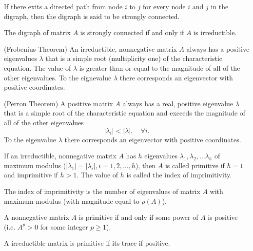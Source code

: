 \begin{definition}
If there exits a directed path from node $i$ to $j$ for every node $i$ and $j$ in the digraph, then the digraph is said to be strongly connected.
\end{definition}

\begin{theorem}
The digraph of matrix $A$ is strongly connected if and only if $A$ is irreductible.
\end{theorem}


\begin{theorem}(Frobenius Theorem)
An irreductible, nonnegative matrix $A$ always has a positive eigenvalues $\lambda$ that is a simple root (multiplicity one) of the characteristic equation. The value of $\lambda$ is greater than or equal to the magnitude of all of the other eigenvalues. To the eignevalue $\lambda$ there corresponds an eigenvector with positive coordinates.
\end{theorem}


\begin{theorem}(Perron Theorem)
A positive matrix $A$ always has a real, positive eigenvalue $\lambda$ that is a simple root of the characteristic equation and exceeds the magnitude of all of the other eigenvalues
$$|\lambda _i|<|\lambda|,\quad \forall i.$$
To the eigenvalue $\lambda$ there corresponds an eigenvector with positive coordinates.
\end{theorem}


\begin{definition}
If an irreductible, nonnegative matrix $A$ has $h$ eigenvalues $\lambda _1, \lambda _2, \dots \lambda _h$ of maximum modulus ($|\lambda _1 |= |\lambda _i|, i=1,2,\dots ,h $), then $A$ is called primitive if $h=1$ and imprimitive if $h>1$. The value of $h$ is called the index of imprimitivity.
\end{definition}

The index of imprimitivity is the number of eigenvalues of matrix $A$ with maximum modulus (with magnitude equal to $\rho(A)$).

\begin{theorem}
A nonnegative matrix $A$ is primitive if and only if some power of $A$ is positive (i.e. $A^p>0$ for some integer $p\geq 1$).
\end{theorem}

\begin{theorem}\cite{BermanPlemmons1994}
A irreductible matrix is primitive if its trace if positive. 
\end{theorem}

